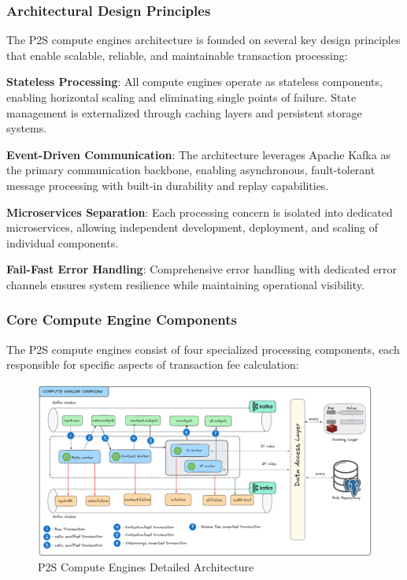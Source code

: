 \subsubsection{Architectural Design Principles}

The P2S compute engines architecture is founded on several key design principles that enable scalable, reliable, and maintainable transaction processing:

\textbf{Stateless Processing}: All compute engines operate as stateless components, enabling horizontal scaling and eliminating single points of failure. State management is externalized through caching layers and persistent storage systems.

\textbf{Event-Driven Communication}: The architecture leverages Apache Kafka as the primary communication backbone, enabling asynchronous, fault-tolerant message processing with built-in durability and replay capabilities.

\textbf{Microservices Separation}: Each processing concern is isolated into dedicated microservices, allowing independent development, deployment, and scaling of individual components.

\textbf{Fail-Fast Error Handling}: Comprehensive error handling with dedicated error channels ensures system resilience while maintaining operational visibility.

\subsubsection{Core Compute Engine Components}

The P2S compute engines consist of four specialized processing components, each responsible for specific aspects of transaction fee calculation:

\begin{figure}[H]
    \centering
    \includegraphics[width=1\textwidth]{img/arch/stateless-architecture.png}
    \caption{P2S Compute Engines Detailed Architecture}
    \label{fig:compute_engines_architecture}
\end{figure}

